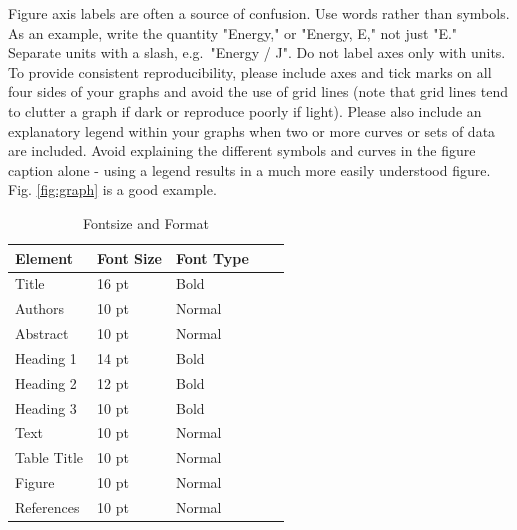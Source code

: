 \documentclass[10pt,a4paper,oneside,twocolumn]{article}
\begin{document}
Figure axis labels are often a source of confusion. Use words rather than symbols. As an example, write the quantity "Energy," or "Energy, E," not just "E." %
Separate units with a slash, e.g.\ "Energy / J". Do not label axes only with units. 
To provide consistent reproducibility, please include axes and tick marks on all four sides of your graphs and avoid the use of grid lines (note that grid lines tend to clutter a graph if dark or reproduce poorly if light). Please also include an explanatory legend within your graphs when two or more curves or sets of data are included. Avoid explaining the different symbols and curves in the figure caption alone - using a legend results in a much more easily understood figure. Fig. \ref{fig:graph} is a good example.
\begin{table}[!h]
\caption{Fontsize and Format}
\label{tab:fonts}
\centering
\begin{tabular}{l l l l l }

Element & Font Size & Font Type\\
\hline
Title				& 16 pt	& Bold \\
Authors			& 10 pt	& Normal \\
Abstract  			& 10 pt	& Normal \\
Heading 1			& 14 pt	& Bold \\
Heading 2			& 12 pt	& Bold	 \\
Heading 3			& 10 pt	& Bold	 \\
Text				& 10 pt	& Normal \\
Table Title			& 10 pt	& Normal \\
Figure				& 10 pt	& Normal \\
References			& 10 pt	& Normal \\
\hline
\end{tabular}
\end{table}
\end{document}
